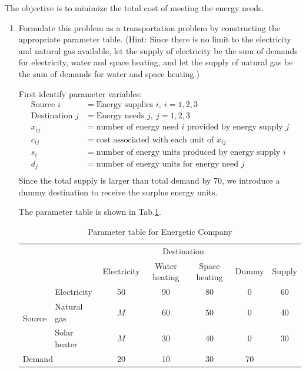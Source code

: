 \documentclass[a4paper]{article}
\begin{document}
\begin{enumerate}
The objective is to minimize the total cost of meeting the energy needs.
\begin{enumerate}
	\item Formulate this problem as a transportation problem by constructing the appropriate parameter table. (Hint: Since there is no limit to the electricity and natural gas available, let the supply of electricity be the sum of demands for electricity, water and space heating, and let the supply of natural gas be the sum of demands for water and space heating.)
	\begin{solution}
		
		First identify parameter variables:
		\begin{equation*}
		\begin{aligned}
		\text{Source }i&=\text{Energy supplies }i,\ i=1,2,3\\
		\text{Destination }j&=\text{Energy needs }j,\ j=1,2,3\\
		x_{ij}&=\text{number of energy need } i \text{ provided by energy supply } j\\
		c_{ij}&=\text{cost associated with each unit of }x_{ij}\\
		s_i&=\text{number of energy units produced by energy supply }i\\
		d_j&=\text{number of energy units for energy need } j\\
		\end{aligned}
		\end{equation*}
		Since the total supply is larger than total demand by 70, we introduce a dummy destination to receive the surplus energy units.
		
		\hspace*{4ex}The parameter table is shown in Tab.\ref{tab2}.
		\begin{table}[H]
			\centering
			\caption{Parameter table for Energetic Company}
			\label{tab2}
			\begin{tabular}{llccccc}
				\toprule[1.5pt]
				&&\multicolumn{4}{c}{Destination}&\\
				\cmidrule{3-6}
				&&Electricity&Water heating&Space heating&Dummy&Supply\\
				\midrule
				\multirow{3}{*}{Source}
				&Electricity& 50& 90& 80&0&60\\
				&Natural gas& $M$&60& 50&0&40\\
				&Solar heater& $M$&30& 40&0&30\\
				\multicolumn{2}{l}{Demand} &20&10&30&70&\\   	
				\bottomrule[1.5pt]
			\end{tabular}
		\end{table}
		

\end{solution}
\end{enumerate}
\end{enumerate}
\end{document}
